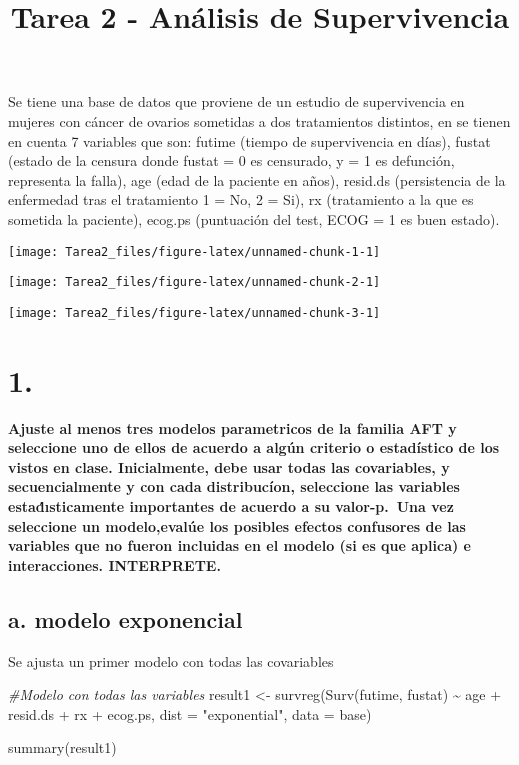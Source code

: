 \documentclass[
]{article}
\title{Tarea 2 - Análisis de Supervivencia}
\author{}
\date{\vspace{-2.5em}}
\newenvironment{Shaded}{\begin{snugshade}}{\end{snugshade}}
\newcommand{\AttributeTok}[1]{\textcolor[rgb]{0.77,0.63,0.00}{#1}}
\newcommand{\CommentTok}[1]{\textcolor[rgb]{0.56,0.35,0.01}{\textit{#1}}}
\newcommand{\FunctionTok}[1]{\textcolor[rgb]{0.00,0.00,0.00}{#1}}
\newcommand{\NormalTok}[1]{#1}
\newcommand{\OtherTok}[1]{\textcolor[rgb]{0.56,0.35,0.01}{#1}}
\newcommand{\SpecialCharTok}[1]{\textcolor[rgb]{0.00,0.00,0.00}{#1}}
\newcommand{\StringTok}[1]{\textcolor[rgb]{0.31,0.60,0.02}{#1}}
\begin{document}
\maketitle

Se tiene una base de datos que proviene de un estudio de supervivencia
en mujeres con cáncer de ovarios sometidas a dos tratamientos distintos,
en se tienen en cuenta 7 variables que son: futime (tiempo de
supervivencia en días), fustat (estado de la censura donde fustat = 0 es
censurado, y = 1 es defunción, representa la falla), age (edad de la
paciente en años), resid.ds (persistencia de la enfermedad tras el
tratamiento 1 = No, 2 = Si), rx (tratamiento a la que es sometida la
paciente), ecog.ps (puntuación del test, ECOG = 1 es buen estado).

\texttt{[image: Tarea2\_files/figure-latex/unnamed-chunk-1-1]}

\texttt{[image: Tarea2\_files/figure-latex/unnamed-chunk-2-1]}

\texttt{[image: Tarea2\_files/figure-latex/unnamed-chunk-3-1]}

\section{1. }

\textbf{Ajuste al menos tres modelos parametricos de la familia AFT y
seleccione uno de ellos de acuerdo a algún criterio o estadístico de los
vistos en clase. Inicialmente, debe usar todas las covariables, y
secuencialmente y con cada distribucíon, seleccione las variables
estad́ısticamente importantes de acuerdo a su valor-p.~Una vez seleccione
un modelo,evalúe los posibles efectos confusores de las variables que no
fueron incluidas en el modelo (si es que aplica) e interacciones.
INTERPRETE.}

\subsection{a. modelo exponencial}

Se ajusta un primer modelo con todas las covariables

\begin{Shaded}
\begin{Highlighting}[]
\CommentTok{\#Modelo con todas las variables}
\NormalTok{result1 }\OtherTok{\textless{}{-}} \FunctionTok{survreg}\NormalTok{(}\FunctionTok{Surv}\NormalTok{(futime, fustat) }\SpecialCharTok{\textasciitilde{}}\NormalTok{ age }\SpecialCharTok{+}\NormalTok{ resid.ds }\SpecialCharTok{+}\NormalTok{ rx }\SpecialCharTok{+}\NormalTok{ ecog.ps, }\AttributeTok{dist =} \StringTok{"exponential"}\NormalTok{, }\AttributeTok{data =}\NormalTok{ base) }

\FunctionTok{summary}\NormalTok{(result1)}
\end{Highlighting}
\end{Shaded}
\end{document}
